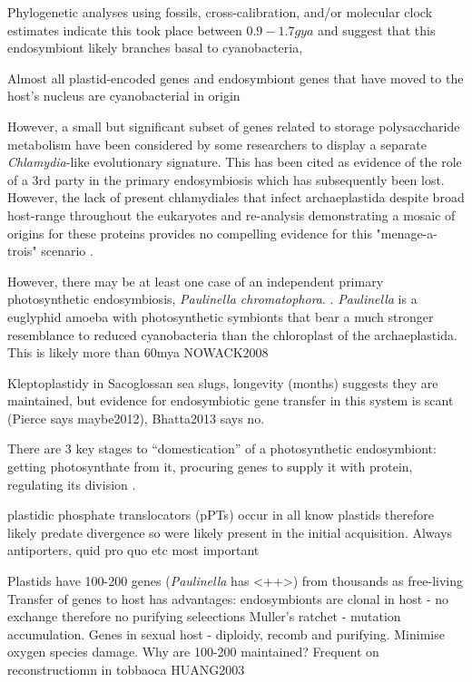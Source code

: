 Phylogenetic analyses using fossils, cross-calibration, and/or molecular clock estimates indicate 
this took place between \(0.9-1.7gya\) \citep{Yoon2004,Parfrey2011,Shih2013,McFadden2014} and 
suggest that this endosymbiont likely branches basal to cyanobacteria, 



Almost all plastid-encoded genes and endosymbiont genes that have moved to the host's nucleus are 
cyanobacterial in origin 


However, a small but significant subset of genes related to storage polysaccharide metabolism have been 
considered by some researchers to display a separate \textit{Chlamydia}-like evolutionary signature.
This has been cited as evidence of the role of a 3rd party in the primary endosymbiosis which has subsequently
been lost.  However, the lack of present chlamydiales that infect archaeplastida despite broad host-range throughout 
the eukaryotes and re-analysis demonstrating a mosaic of origins for these proteins provides no compelling
evidence for this "menage-a-trois" scenario \citep{Domman2015}.




However, there may be at least one case of an independent primary photosynthetic endosymbiosis, \textit{Paulinella chromatophora}.
\citep{McFadden2014}. \textit{Paulinella} is a euglyphid amoeba with photosynthetic symbionts that bear a much stronger
resemblance to reduced cyanobacteria than the chloroplast of the archaeplastida.  
This is likely more than 60mya  NOWACK2008


Kleptoplastidy in Sacoglossan sea slugs, longevity (months) suggests they are maintained, 
but evidence for endosymbiotic gene transfer in this system is scant (Pierce says maybe2012), Bhatta2013 says no.


There are 3 key stages to ``domestication'' of a photosynthetic endosymbiont: getting photosynthate from it,
procuring genes to supply it with protein, regulating its division \citep{McFadden2014}.

plastidic phosphate translocators (pPTs) occur in all know plastids therefore likely predate divergence so were
likely present in the initial acquisition.  Always antiporters, quid pro quo etc  most important


Plastids have 100-200 genes (\textit{Paulinella} has <++>) from thousands as free-living
Transfer of genes to host has advantages: endosymbionts are clonal in host - no exchange therefore no purifying seleections
Muller's ratchet - mutation accumulation.
Genes in sexual host - diploidy, recomb and purifying.
Minimise oxygen species damage.
Why are 100-200 maintained?
Frequent on reconstructiomn in tobbaoca HUANG2003

